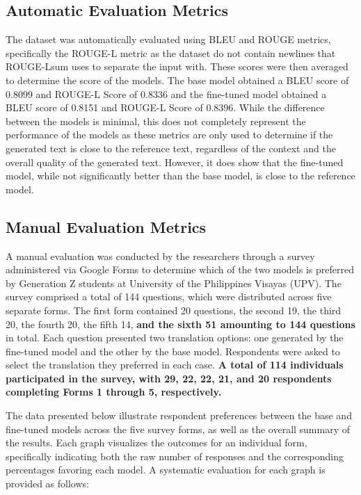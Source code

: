 \subsection{Automatic Evaluation Metrics}
The dataset was automatically evaluated using BLEU and ROUGE metrics, specifically the ROUGE-L metric as the dataset do not contain newlines that ROUGE-Lsum uses to separate the input with. These scores were then averaged to determine the score of the models. The base model obtained a BLEU score of 0.8099 and ROUGE-L Score of 0.8336 and the fine-tuned model obtained a BLEU score of 0.8151 and ROUGE-L Score of 0.8396. While the difference between the models is minimal, this does not completely represent the performance of the models as these metrics are only used to determine if the generated text is close to the reference text, regardless of the context and the overall quality of the generated text. However, it does show that the fine-tuned model, while not significantly better than the base model, is close to the reference model.

\subsection{Manual Evaluation Metrics}
A manual evaluation was conducted by the researchers through a survey administered via Google Forms to determine which of the two models is preferred by Generation Z students at University of the Philippines Visayas (UPV). The survey comprised a total of 144 questions, which were distributed across five separate forms. The first form contained 20 questions, the second 19, the third 20, the fourth 20, the fifth 14, \textbf{and the sixth 51 amounting to 144 questions} in total. Each question presented two translation options: one generated by the fine-tuned model and the other by the base model. Respondents were asked to select the translation they preferred in each case.\textbf{ A total of 114 individuals participated in the survey, with 29, 22, 22, 21, and 20 respondents completing Forms 1 through 5, respectively. }

The data presented below illustrate respondent preferences between the base and fine-tuned models across the five survey forms, as well as the overall summary of the results. Each graph visualizes the outcomes for an individual form, specifically indicating both the raw number of responses and the corresponding percentages favoring each model. A systematic evaluation for each graph is provided as follows:

